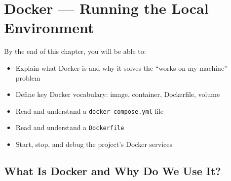 \documentclass[12pt, a4paper, oneside]{report}
\begin{document}
\chapter{Docker --- Running the Local Environment}
\label{ch:docker}

\begin{objectivebox}
By the end of this chapter, you will be able to:
\begin{itemize}
    \item Explain what Docker is and why it solves the ``works on my machine'' problem
    \item Define key Docker vocabulary: image, container, Dockerfile, volume
    \item Read and understand a \texttt{docker-compose.yml} file
    \item Read and understand a \texttt{Dockerfile}
    \item Start, stop, and debug the project's Docker services
\end{itemize}
\end{objectivebox}

\section{What Is Docker and Why Do We Use It?}
\end{document}
